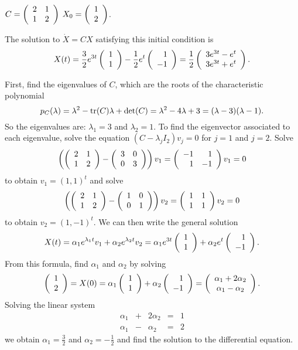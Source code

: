 \documentclass{ximera}
\begin{document}
\begin{exercise}  \label{c4.10A.1d}
$C = \left(\begin{array}{rr} 2 & 1\\ 1 &2\end{array}\right)$ \AND $X_0 = \left(\begin{array}{r} 1 \\ 2\end{array}\right)$.

\begin{solution}
\ans The solution to $\dot{X} = CX$ satisfying this
initial condition is
\[
X(t) = \frac{3}{2}e^{3t}\left(\begin{array}{r} 1 \\ 1\end{array}\right) - \frac{1}{2}e^t\left(\begin{array}{r} 1 \\ -1\end{array}\right)
= \frac{1}{2}\left(\begin{array}{c} 3e^{3t} - e^t \\ 3e^{3t} + e^t\end{array}\right).
\]

\soln First, find the eigenvalues of $C$, which are the roots of the
characteristic polynomial
\[
p_C(\lambda) = \lambda^2 - {\rm tr}(C)\lambda + \det(C) =
\lambda^2 - 4\lambda + 3 = (\lambda - 3)(\lambda - 1).
\]
So the eigenvalues are: $\lambda_1 = 3$ and $\lambda_2 = 1$.
To find the eigenvector associated to each eigenvalue, solve
the equation $(C - \lambda_jI_2)v_j = 0$ for $j = 1$ and $j = 2$.  Solve
\[
\left(\left(\begin{array}{rr} 2 & 1\\ 1 &2\end{array}\right) - \left(\begin{array}{rr} 3 & 0\\ 0 &3\end{array}\right)\right)v_1 =
\left(\begin{array}{rr} -1 & 1\\ 1 &-1\end{array}\right)v_1 = 0
\]
to obtain $v_1 = (1,1)^t$ and solve
\[
\left(\left(\begin{array}{rr} 2 & 1\\ 1 &2\end{array}\right) - \left(\begin{array}{rr} 1 & 0\\ 0 &1\end{array}\right)\right)v_2 =
\left(\begin{array}{rr} 1 & 1\\ 1 &1\end{array}\right)v_2 = 0
\]
to obtain $v_2 = (1,-1)^t$.  We can then write the general solution
\[
X(t) = \alpha_1e^{\lambda_1 t}v_1 + \alpha_2e^{\lambda_2 t}v_2
= \alpha_1e^{3t}\left(\begin{array}{r} 1 \\ 1\end{array}\right) + \alpha_2e^t\left(\begin{array}{r} 1 \\ -1\end{array}\right).
\]
From this formula, find $\alpha_1$ and $\alpha_2$ by solving
\[
\left(\begin{array}{r} 1 \\ 2\end{array}\right) = X(0) = \alpha_1\left(\begin{array}{r} 1 \\ 1\end{array}\right) + \alpha_2\left(\begin{array}{r} 1 \\ -1\end{array}\right) =
\left(\begin{array}{c} \alpha_1 + 2\alpha_2 \\ \alpha_1 - \alpha_2\end{array}\right).
\]
Solving the linear system
\[
\begin{array}{rrrrr}
\alpha_1 & + & 2\alpha_2 & = & 1 \\
\alpha_1 & - & \alpha_2 & = & 2
\end{array}
\]
we obtain $\alpha_1 = \frac{3}{2}$ and $\alpha_2 = -\frac{1}{2}$
and find the solution to the differential equation.

\end{solution}
\end{exercise}
\end{document}
